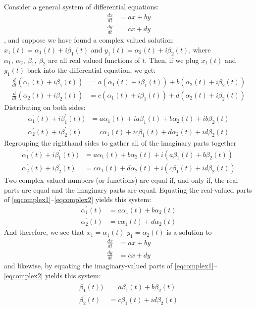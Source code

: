 Consider a general system of differential equations:
\begin{align*}
\frac{dx}{dt} &= ax+by\\
\frac{dy}{dt} &= cx+dy
\end{align*}, and suppose we have found a complex valued solution: $x_1(t) = \alpha_1(t) + i\beta_1(t)$ and $y_1(t) = \alpha_2(t) + i\beta_2(t)$, where $\alpha_1,~\alpha_2,~\beta_1,~\beta_2$ are all real valued functions of $t$.  
Then, if we plug $x_1(t)$ and $y_1(t)$ back into the differential equation, we get:
\begin{align*}
\frac{d}{dt} (\alpha_1(t) + i\beta_1(t)) &= a(\alpha_1(t) + i\beta_1(t)) + b(\alpha_2(t) + i\beta_2(t)) \\
\frac{d}{dt} (\alpha_2(t) + i\beta_2(t)) &= c(\alpha_1(t) + i\beta_1(t)) + d(\alpha_2(t) + i\beta_2(t))
\end{align*}
Distributing on both sides:
\begin{align*}
\alpha_1^\prime(t) + i\beta_1^\prime(t)) &= a\alpha_1(t) + ia\beta_1(t) + b\alpha_2(t) + ib\beta_2(t) \\
\alpha_2^\prime(t) + i\beta_2^\prime(t) &= c\alpha_1(t) + ic\beta_1(t) + d\alpha_2(t) + id\beta_2(t)
\end{align*}
Regrouping the righthand sides to gather all of the imaginary parts together
\begin{align}
\alpha_1^\prime(t) + i\beta_1^\prime(t)) &= a\alpha_1(t)+ b\alpha_2(t) + i(a\beta_1(t)  + b\beta_2(t)) \label{eqcomplex1}\\
\alpha_2^\prime(t) + i\beta_2^\prime(t) &= c\alpha_1(t)+ d\alpha_2(t) + i(c\beta_1(t)  + id\beta_2(t))\label{eqcomplex2}
\end{align}
Two complex-valued numbers (or functions) are equal if, and only if, the real parts are equal and the imaginary parts are equal.  
Equating the real-valued parts of  \ref{eqcomplex1}--\ref{eqcomplex2} yields this system:
\begin{align*}
\alpha_1^\prime(t) &= a\alpha_1(t)+ b\alpha_2(t)  \\
\alpha_2^\prime(t) &= c\alpha_1(t)+ d\alpha_2(t) 
\end{align*}
And therefore, we see that $x_1=\alpha_1(t)$ $y_1=\alpha_2(t)$ is a solution to 
\begin{align*}
\frac{dx}{dt} &= ax+by\\
\frac{dy}{dt} &= cx+dy
\end{align*}
and likewise, by equating the imaginary-valued parts of \ref{eqcomplex1}--\ref{eqcomplex2} yields this system:\begin{align*}
\beta_1^\prime(t)) &= a\beta_1(t)  + b\beta_2(t) \\
\beta_2^\prime(t) &= c\beta_1(t)  + id\beta_2(t)
\end{align*}
